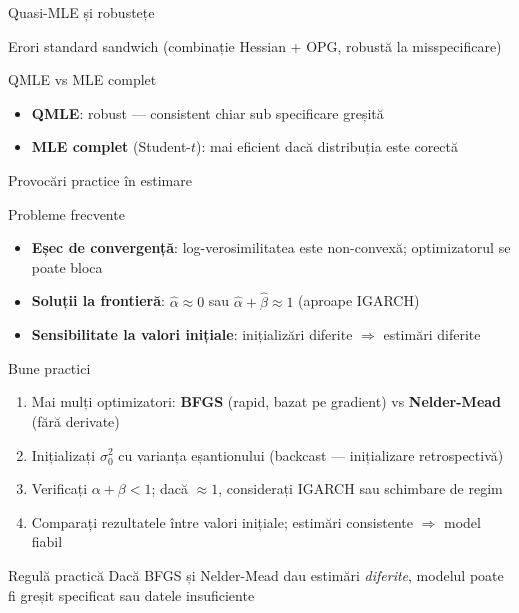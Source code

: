 \documentclass[9pt, aspectratio=169, t]{beamer}
\begin{document}
\begin{frame}{Quasi-MLE și robustețe}
\begin{alertblock}{Erori standard sandwich (combinație Hessian + OPG, robustă la misspecificare)}
\begin{itemize}
            \end{itemize}
        \end{alertblock}
        \vspace{-0.3cm}
        \begin{exampleblock}{QMLE vs MLE complet}
            \begin{itemize}
                \item \textbf{QMLE}: robust --- consistent chiar sub specificare greșită
                \item \textbf{MLE complet} (Student-$t$): mai eficient dacă distribuția este corectă
            \end{itemize}
        \end{exampleblock}
\end{frame}

\begin{frame}{Provocări practice în estimare}
    \small
        \begin{block}{Probleme frecvente}
            \begin{itemize}
                \item \textbf{Eșec de convergență}: log-verosimilitatea este non-convexă; optimizatorul se poate bloca
                \item \textbf{Soluții la frontieră}: $\hat{\alpha} \approx 0$ sau $\hat{\alpha} + \hat{\beta} \approx 1$ (aproape IGARCH)
                \item \textbf{Sensibilitate la valori inițiale}: inițializări diferite $\Rightarrow$ estimări diferite
            \end{itemize}
        \end{block}
        \vspace{-1mm}
        \begin{exampleblock}{Bune practici}
            \begin{enumerate}
                \item Mai mulți optimizatori: \textbf{BFGS} (rapid, bazat pe gradient) vs \textbf{Nelder-Mead} (fără derivate)
                \item Inițializați $\sigma_0^2$ cu varianța eșantionului (backcast --- inițializare retrospectivă)
                \item Verificați $\alpha + \beta < 1$; dacă $\approx 1$, considerați IGARCH sau schimbare de regim
                \item Comparați rezultatele între valori inițiale; estimări consistente $\Rightarrow$ model fiabil
            \end{enumerate}
        \end{exampleblock}
        \vspace{-1mm}
        \begin{alertblock}{Regulă practică}
            Dacă BFGS și Nelder-Mead dau estimări \textit{diferite}, modelul poate fi greșit specificat sau datele insuficiente
        \end{alertblock}
\end{frame}
\end{document}
